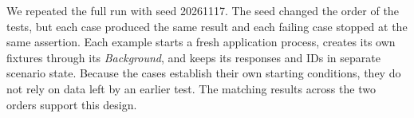 We repeated the full run with seed 20261117. The seed changed the order of the
tests, but each case produced the same result and each failing case stopped at
the same assertion. Each example starts a fresh application process, creates
its own fixtures through its \textit{Background}, and keeps its responses and IDs
in separate scenario state. Because the cases establish their own starting
conditions, they do not rely on data left by an earlier test. The matching
results across the two orders support this design.
